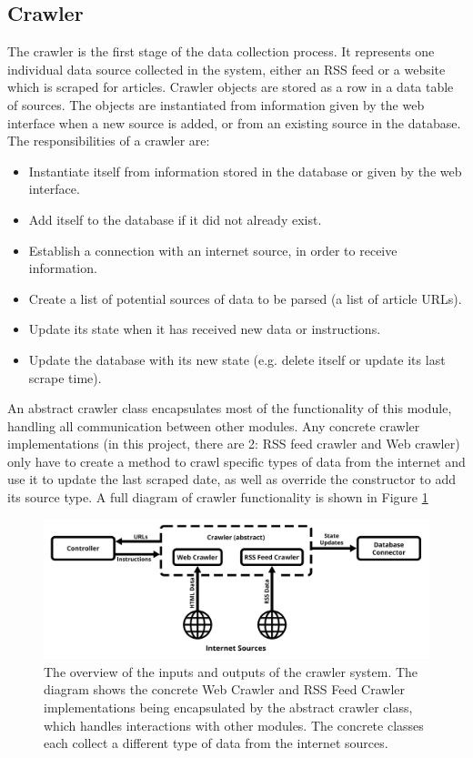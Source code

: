 \documentclass{l4proj}
\begin{document}
\subsection{Crawler}
The crawler is the first stage of the data collection process. It represents one individual data source collected in the system, either an RSS feed or a website which is scraped for articles. Crawler objects are stored as a row in a data table of sources. The objects are instantiated from information given by the web interface when a new source is added, or from an existing source in the database. The responsibilities of a crawler are:
\begin{itemize}
    \item Instantiate itself from information stored in the database or given by the web interface.
    \item Add itself to the database if it did not already exist.
    \item Establish a connection with an internet source, in order to receive information.
    \item Create a list of potential sources of data to be parsed (a list of article URLs).
    \item Update its state when it has received new data or instructions.
    \item Update the database with its new state (e.g. delete itself or update its last scrape time).
\end{itemize}
An abstract crawler class encapsulates most of the functionality of this module, handling all communication between other modules. Any concrete crawler implementations (in this project, there are 2: RSS feed crawler and Web crawler) only have to create a method to crawl specific types of data from the internet and use it to update the last scraped date, as well as override the constructor to add its source type. A full diagram of crawler functionality is shown in Figure \ref{fig:crawler_diagram}
 \begin{figure}[h]
\centering
\includegraphics[width=\textwidth]{images/Crawler-diagram.png}
\caption{The overview of the inputs and outputs of the crawler system. The diagram shows the concrete Web Crawler and RSS Feed Crawler implementations being encapsulated by the abstract crawler class, which handles interactions with other modules. The concrete classes each collect a different type of data from the internet sources.}
\label{fig:crawler_diagram}
\end{figure}
\end{document}
